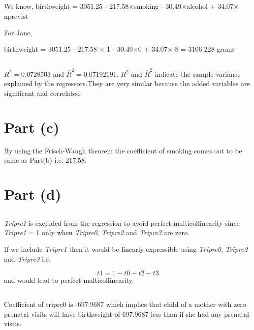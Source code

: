 \documentclass{./solution}
\begin{document}
\begin{solution}
            \subsection{}
            We know,
            birthweight = 3051.25 - 217.58$\times$smoking - 30.49$\times$alcohol  + 34.07$\times$nprevist

            For Jane,

            birthweight = 3051.25 - 217.58 $\times$ 1 - 30.49$\times$0  + 34.07$\times$ 8 = $3106.228 $ grams

            \subsection{}
            $R^{2} = 0.0728503$ and $\bar{R}^{2}=0.07192191$.
            $R^{2}$ and $\bar{R}^{2}$  indicate the sample variance explained
            by the regressors.They are very similar because the added variables
            are significant and correlated.

        \section{Part (c)}
            By using the Frisch-Waugh theorem the coefficient of smoking comes out to be same as Part(b) i.e. 217.58.

        \section{Part (d)}
            \subsection{}
            \textit{Tripre1} is excluded from the regression to avoid perfect
            multicollinearity since \textit{Tripre1} = 1 only when  \textit{Tripre0},  \textit{Tripre2} and  \textit{Tripre3} are zero.

            If we include \textit{Tripre1} then it would be linearly expressible
            using \textit{Tripre0},  \textit{Tripre2} and  \textit{Tripre3} i.e.

            \[ t1 = 1 - t0 -t2 -t3 \] and would lead to perfect multicollinearity.

            \subsection{}
            Coefficient of tripre0 is -697.9687 which implies that child of a mother
            with zero prenatal visits will have birthweight of 697.9687 less than if she had any prenatal visits.


\end{solution}
\end{document}

